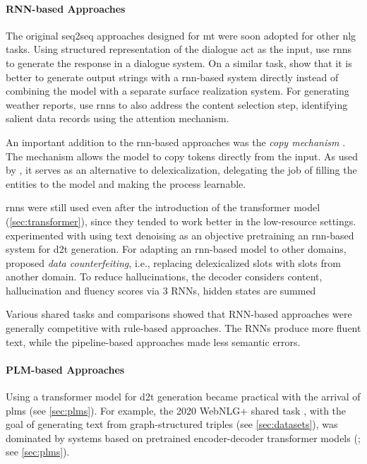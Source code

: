 {\paragraph{RNN-based Approaches} The original seq2seq approaches designed for \ac{mt} \cite{cho2014learning,sutskever2014sequence} were soon adopted for other \ac{nlg} tasks. Using structured representation of the dialogue act as the input, \citet{wen2015semantically} use \acp{rnn} to generate the response in a dialogue system. On a similar task, \citet{dusekSequencetoSequenceGenerationSpoken2016} show that it is better to generate output strings with a \ac{rnn}-based system directly instead of combining the model with a separate surface realization system. For generating weather reports, \citet{mei2016talk} use \acp{rnn} to also address the content selection step, identifying salient data records using the attention mechanism.

An important addition to the \ac{rnn}-based approaches was the \emph{copy mechanism} \cite{gu2016incorporating,seeGetPointSummarization2017}. The mechanism allows the model to copy tokens directly from the input. As used by \citet{gehrmannEndtoEndContentPlan2018}, it serves as an alternative to delexicalization, delegating the job of filling the entities to the model and making the process learnable.

\acp{rnn} were still used even after the introduction of the transformer model (\autoref{sec:transformer}), since they tended to work better in the low-resource settings. \citet{freitagUnsupervisedNaturalLanguage2018} experimented with using text denoising as an objective pretraining an \ac{rnn}-based system for \ac{d2t} generation. For adapting an \ac{rnn}-based model to other domains, \citet{wen2020recurrent} proposed \emph{data counterfeiting}, i.e., replacing delexicalized slots with slots from another domain. To reduce hallucinations, \citet{rebuffel2021controlling} the decoder considers content, hallucination and fluency scores via 3 RNNs, hidden states are summed


Various shared tasks and comparisons \cite{gardentWebNLGChallengeGenerating2017,dusekEvaluatingStateoftheartEndtoEnd2020,ferreiraNeuralDatatotextGeneration2019} showed that RNN-based approaches were generally competitive with rule-based approaches. The RNNs produce more fluent text, while the pipeline-based approaches made less semantic errors.


\paragraph{PLM-based Approaches} Using a transformer model for \ac{d2t} generation became practical with the arrival of \acp{plm} (see \autoref{sec:plms}). For example, the 2020 WebNLG+ shared task \cite{ferreira20202020}, with the goal of generating text from graph-structured triples (see \autoref{sec:datasets}), was dominated by systems based on pretrained encoder-decoder transformer models (\citealp{yang2020improving,agarwalMachineTranslationAided2020,kasnerTrainHardFinetune2020}; see \autoref{sec:plms}).

}
